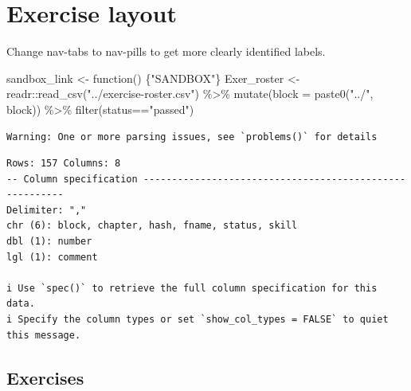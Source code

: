 \documentclass[
  letterpaper,
  DIV=11,
  numbers=noendperiod,
  oneside]{article}
\newenvironment{Shaded}{\begin{snugshade}}{\end{snugshade}}
\newcommand{\AttributeTok}[1]{\textcolor[rgb]{0.40,0.45,0.13}{#1}}
\newcommand{\ControlFlowTok}[1]{\textcolor[rgb]{0.00,0.23,0.31}{#1}}
\newcommand{\FunctionTok}[1]{\textcolor[rgb]{0.28,0.35,0.67}{#1}}
\newcommand{\NormalTok}[1]{\textcolor[rgb]{0.00,0.23,0.31}{#1}}
\newcommand{\OtherTok}[1]{\textcolor[rgb]{0.00,0.23,0.31}{#1}}
\newcommand{\SpecialCharTok}[1]{\textcolor[rgb]{0.37,0.37,0.37}{#1}}
\newcommand{\StringTok}[1]{\textcolor[rgb]{0.13,0.47,0.30}{#1}}
\begin{document}
\hypertarget{exercise-layout}{%
\chapter{Exercise layout}\label{exercise-layout}}

Change nav-tabs to nav-pills to get more clearly identified labels.

\begin{Shaded}
\begin{Highlighting}[]
\NormalTok{sandbox\_link }\OtherTok{\textless{}{-}} \ControlFlowTok{function}\NormalTok{() \{}\StringTok{"SANDBOX"}\NormalTok{\}}
\NormalTok{Exer\_roster }\OtherTok{\textless{}{-}}\NormalTok{ readr}\SpecialCharTok{::}\FunctionTok{read\_csv}\NormalTok{(}\StringTok{"../exercise{-}roster.csv"}\NormalTok{) }\SpecialCharTok{\%\textgreater{}\%}
  \FunctionTok{mutate}\NormalTok{(}\AttributeTok{block =} \FunctionTok{paste0}\NormalTok{(}\StringTok{"../"}\NormalTok{, block)) }\SpecialCharTok{\%\textgreater{}\%}
  \FunctionTok{filter}\NormalTok{(status}\SpecialCharTok{==}\StringTok{"passed"}\NormalTok{)}
\end{Highlighting}
\end{Shaded}

\begin{verbatim}
Warning: One or more parsing issues, see `problems()` for details
\end{verbatim}

\begin{verbatim}
Rows: 157 Columns: 8
-- Column specification --------------------------------------------------------
Delimiter: ","
chr (6): block, chapter, hash, fname, status, skill
dbl (1): number
lgl (1): comment

i Use `spec()` to retrieve the full column specification for this data.
i Specify the column types or set `show_col_types = FALSE` to quiet this message.
\end{verbatim}

\hypertarget{exercises}{%
\section{Exercises}\label{exercises}}
\end{document}
